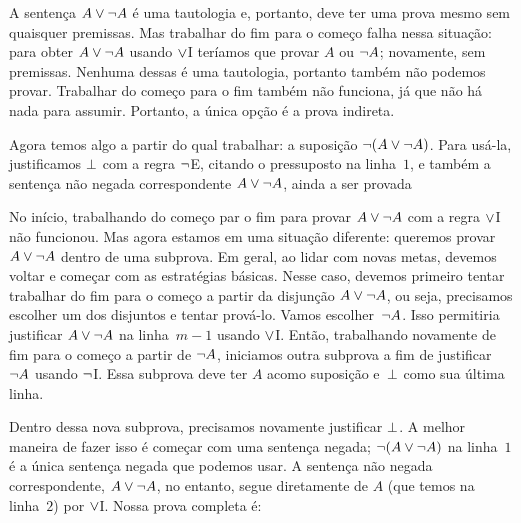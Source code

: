A senten\c ca $A \vee \neg A$ \'e uma tautologia e, portanto, deve ter uma prova mesmo sem quaisquer premissas. Mas trabalhar do fim para o come\c co falha nessa situa\c c\~ao: para obter $A \vee \neg A$ usando $\vee$I ter\'iamos que provar $A$ ou $\neg A$; novamente, sem premissas. Nenhuma dessas \'e uma tautologia, portanto tamb\'em n\~ao podemos provar. Trabalhar  do come\c co para o fim tamb\'em n\~ao funciona, j\'a que n\~ao h\'a nada para assumir. Portanto, a \'unica op\c c\~ao \'e a prova indireta.
\begin{fitchproof}
	\open
	\ellipsesline
	\close
\end{fitchproof}
Agora temos algo a partir do qual trabalhar: a suposi\c c\~ao  $\neg(A \vee \neg A)$. Para us\'a-la, justificamos $\bot$ com a regra $\neg$E, citando o pressuposto na linha~$1$, e tamb\'em a senten\c ca n\~ao negada correspondente $A \vee \neg A$, ainda a ser provada
\begin{fitchproof}
	\open
	\ellipsesline
	\close
\end{fitchproof}


No in\'icio, trabalhando  do come\c co par o fim para provar $A \vee\neg A$ com a regra $\vee$I n\~ao funcionou. Mas agora estamos em uma situa\c c\~ao diferente: queremos provar $A \vee\neg A$ dentro de uma subprova. Em geral, ao lidar com novas metas, devemos voltar e come\c car com as estrat\'egias b\'asicas. Nesse caso, devemos primeiro tentar trabalhar do fim para o come\c co a partir da disjun\c c\~ao $A \vee \neg A$, ou seja, precisamos escolher um dos disjuntos  e tentar prov\'a-lo. Vamos escolher~$\neg A$. Isso permitiria justificar $A \vee \neg A$ na linha~$m - 1$ usando $\vee$I. Ent\~ao, trabalhando novamente de fim para o come\c co a partir de $\neg A$, iniciamos outra subprova a fim de justificar  $\neg A$ usando $\neg$I. Essa subprova deve ter $A$ acomo suposi\c c\~ao e~$\bot$ como sua \'ultima linha.
\begin{fitchproof}
	\open
	\open
	\ellipsesline
	\close
	\close
\end{fitchproof}
Dentro dessa nova subprova, precisamos novamente justificar $\bot$. A melhor maneira de fazer isso \'e come\c car com uma senten\c ca negada; $\neg(A \vee \neg A)$ na linha~$1$ \'e a \'unica senten\c ca negada que podemos usar. A senten\c ca n\~ao negada correspondente,  $A \vee \neg A$, no entanto, segue diretamente de $A$ (que temos na linha~$2$) por $\vee$I. Nossa prova completa \'e:
\begin{fitchproof}
	\open
	\open
	\close
	\close
\end{fitchproof}

